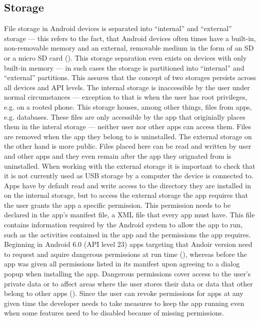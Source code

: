 \subsection{Storage}
\label{android_storage}
File storage in Android devices is separated into ``internal'' and ``external'' storage --- this refers to the fact, that Android devices often times have a built-in, non-removable memory and an external, removable medium in the form of an SD or a micro SD card (\cite{android_storage}). This storage separation even exists on devices with only built-in memory --- in such cases the storage is partitioned into ``internal'' and ``external'' partitions. This assures that the concept of two storages persists across all devices and \gls{API} levels. The internal storage is inaccessible by the user under normal circumstances --- exception to that is when the user has root privileges, e.g. on a rooted phone. This storage houses, among other things, files from apps, e.g. databases. These files are only accessible by the app that originially places them in the interal storage --- neither user nor other apps can access them. Files are removed when the app they belong to is uninstalled. 
The external storage on the other hand is more public. Files placed here can be read and written by user and other apps and they even remain after the app they orignated from is uninstalled. When working with the external storage it is important to check that it is not currently used as \gls{USB} storage by a computer the device is connected to.
Apps have by default read and write access to the directory they are installed in on the internal storage, but to access the external storage the app requires that the user grants the app a specific permission. This permission needs to be declared in the app's manifest file, a XML file that every app must have. This file contains information required by the Android system to allow the app to run, such as the activities contained in the app and the permissions the app requires. Beginning in Android 6.0 (\gls{API} level 23) apps targeting that Andoir version need to request and aquire dangerous permissions at run time (\cite{android_permissions}), whereas before the app was given all permissions listed in its manifest upon agreeing to a dialog popup when installing the app. Dangerous permissions cover access to the user's private data or to affect areas where the user stores their data or data that other belong to other apps (\cite{android_permissions}). Since the user can revoke permissions for apps at any given time the developer needs to take measures to keep the app running even when some features need to be disabled because of missing permissions.  
